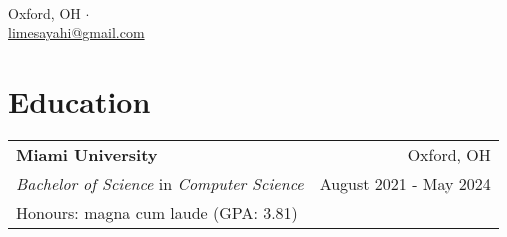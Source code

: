 \documentclass[letterpaper,8pt]{article} %
\begin{document}
\pagestyle{empty} %


\par
{\centering{\LARGE \setmainfont{EB Garamond}{Emil Sayahi}}\\

\footnotesize{
Oxford, OH
$\cdot$
\href{tel:+1-513-484-0972}{\color{black}{+1 (513) 484-0972}}\\
\href{mailto:limesayahi@gmail.com}{\color{black}limesayahi@gmail.com}\\
}} %




\section{Education}

\footnotesize{
\begin{tabular*}{\linewidth}{@{\extracolsep{\fill}} lr }
\textbf{Miami University} & Oxford, OH\\
\emph{Bachelor of Science} in \emph{Computer Science} & August 2021 - May 2024\\
\multicolumn{2}{p{\linewidth}}{Honours: magna cum laude (GPA\@: 3.81)}\\
\end{tabular*}}
\end{document}
